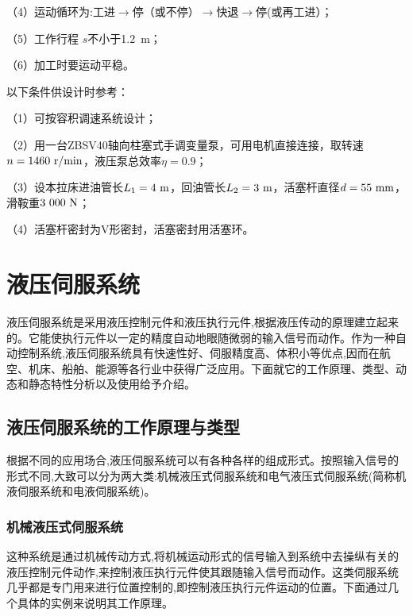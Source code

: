 （4）运动循环为:工进$\rightarrow $停（或不停）$\rightarrow $快退$\rightarrow $停(或再工进）；

（5）工作行程 $s$不小于1.2\ m；

（6）加工时要运动平稳。

以下条件供设计时参考：

（1）可按容积调速系统设计；

（2）用一台ZBSV40轴向柱塞式手调变量泵，可用电机直接连接，取转速$n=1460\rm \ r/min$，液压泵总效率$\eta=0.9$；

（3）设本拉床进油管长$L_\text{1}=4\ \rm m$，回油管长$L_\text{2}=3\ \rm m$，活塞杆直径$d=55\ \rm mm$，滑鞍重$3\ 000\ \rm N$；

（4）活塞杆密封为V形密封，活塞密封用活塞环。

\chapter{液压伺服系统}

液压伺服系统是采用液压控制元件和液压执行元件,根据液压传动的原理建立起来的。它能使执行元件以一定的精度自动地眼随微弱的输入信号而动作。作为一种自动控制系统,液压伺服系统具有快速性好、伺服精度高、体积小等优点,因而在航空、机床、船舶、能源等各行业中获得广泛应用。下面就它的工作原理、类型、动态和静态特性分析以及使用给予介绍。

\section{液压伺服系统的工作原理与类型}
根据不同的应用场合,液压伺服系统可以有各种各样的组成形式。按照输入信号的形式不同,大致可以分为两大类:机械液压式伺服系统和电气液压式伺服系统(简称机液伺服系统和电液伺服系统)。

\subsection{机械液压式伺服系统}

这种系统是通过机械传动方式,将机械运动形式的信号输入到系统中去操纵有关的液压控制元件动作,来控制液压执行元件使其跟随输入信号而动作。这类伺服系统几乎都是专门用来进行位置控制的,即控制液压执行元件运动的位置。下面通过几个具体的实例来说明其工作原理。

